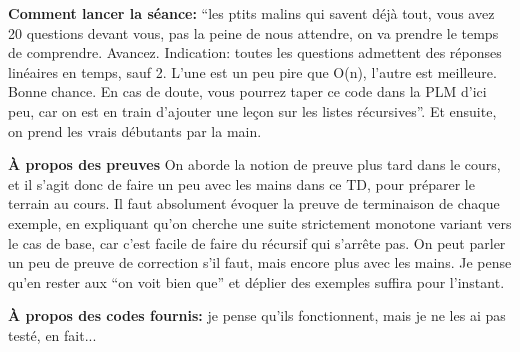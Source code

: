\documentclass[10pt]{article}\usepackage[nu]{esial}
\begin{document}
\begin{Reponse}
  \textbf{Comment lancer la séance:} ``les ptits malins qui savent déjà tout,
  vous avez 20 questions devant vous, pas la peine de nous attendre, on va
  prendre le temps de comprendre. Avancez. Indication: toutes les questions
  admettent des réponses linéaires en temps, sauf 2. L'une est un peu pire que
  O(n), l'autre est meilleure. Bonne chance. En cas de doute, vous pourrez taper
  ce code dans la PLM d'ici peu, car on est en train d'ajouter une leçon sur les
  listes récursives''. Et ensuite, on prend les vrais débutants par la main.

  \textbf{À propos des preuves} On aborde la notion de preuve plus tard dans le
  cours, et il s'agit donc de faire un peu avec les mains dans ce TD, pour
  préparer le terrain au cours. Il faut absolument évoquer la preuve de
  terminaison de chaque exemple, en expliquant qu'on cherche une suite
  strictement monotone variant vers le cas de base, car c'est facile de faire du
  récursif qui s'arrête pas. On peut parler un peu de preuve de correction s'il
  faut, mais encore plus avec les mains. Je pense qu'en rester aux ``on voit
  bien que'' et déplier des exemples suffira pour l'instant.

  \textbf{À propos des codes fournis:} je pense qu'ils fonctionnent, mais je ne
  les ai pas testé, en fait...


\end{Reponse}
\end{document}
